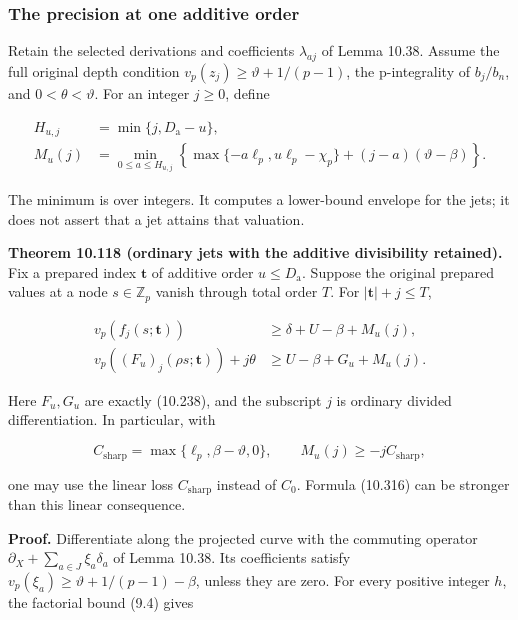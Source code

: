 \documentclass[
  11pt,
  a4paper,
]{article}
\begin{document}
\subsubsection{The precision at one additive
order}\label{the-precision-at-one-additive-order}

Retain the selected derivations and coefficients \(\lambda_{aj}\) of
Lemma 10.38. Assume the full original depth condition
\(v_p(z_j)\ge\vartheta+1/(p-1)\), the p-integrality of \(b_j/b_n\), and
\(0<\theta<\vartheta\). For an integer \(j\ge0\), define

\[
\begin{aligned}
H_{u,j}&=\min\{j,D_{\mathrm a}-u\},\\
M_u(j)&=\min_{0\le a\le H_{u,j}}
\left\{\max\{-a\ell_p,u\ell_p-\chi_p\}
+(j-a)(\vartheta-\beta)\right\}.
\end{aligned}
\tag{10.316}
\]

The minimum is over integers. It computes a lower-bound envelope for the
jets; it does not assert that a jet attains that valuation.

\textbf{Theorem 10.118 (ordinary jets with the additive divisibility
retained).} Fix a prepared index \(\boldsymbol t\) of additive order
\(u\le D_{\mathrm a}\). Suppose the original prepared values at a node
\(s\in\mathbb Z_p\) vanish through total order \(T\). For
\(|\boldsymbol t|+j\le T\),

\[
\begin{aligned}
v_p(f_j(s;\boldsymbol t))
&\ge\delta+U-\beta+M_u(j),\\
v_p((F_u)_j(\rho s;\boldsymbol t))+j\theta
&\ge U-\beta+G_u+M_u(j).
\end{aligned}
\tag{10.317}
\]

Here \(F_u,G_u\) are exactly (10.238), and the subscript \(j\) is
ordinary divided differentiation. In particular, with

\[
C_{\mathrm{sharp}}=\max\{\ell_p,\beta-\vartheta,0\},
\qquad M_u(j)\ge-j C_{\mathrm{sharp}},
\tag{10.318}
\]

one may use the linear loss \(C_{\mathrm{sharp}}\) instead of \(C_0\).
Formula (10.316) can be stronger than this linear consequence.

\textbf{Proof.} Differentiate along the projected curve with the
commuting operator \(\partial_X+\sum_{a\in J}\xi_a\delta_a\) of Lemma
10.38. Its coefficients satisfy
\(v_p(\xi_a)\ge\vartheta+1/(p-1)-\beta\), unless they are zero. For
every positive integer \(h\), the factorial bound (9.4) gives
\end{document}
